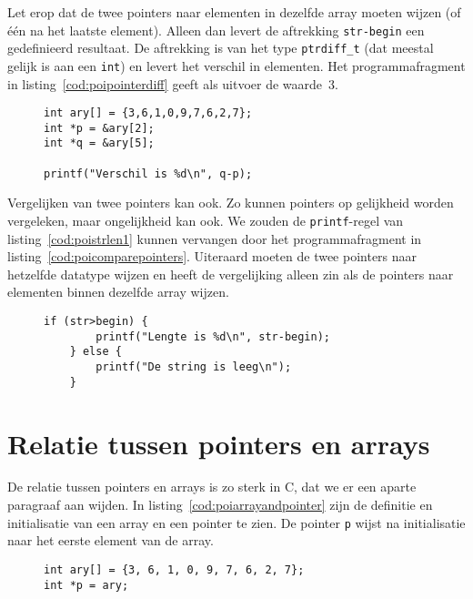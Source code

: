 Let erop dat de twee pointers naar elementen in dezelfde array moeten wijzen (of één na het laatste element). Alleen dan levert de aftrekking \texttt{str-begin} een gedefinieerd resultaat. De aftrekking is van het type \texttt{ptrdiff\_t} (dat meestal gelijk is aan een \texttt{int}) en levert het verschil in elementen. Het programmafragment in listing~\ref{cod:poipointerdiff} geeft als uitvoer de waarde~3.

\begin{figure}[!ht]
\begin{lstlisting}[caption=Het berekenen van het verschil van twee pointers.,label=cod:poipointerdiff]
int ary[] = {3,6,1,0,9,7,6,2,7};
int *p = &ary[2];
int *q = &ary[5];

printf("Verschil is %d\n", q-p);
\end{lstlisting}
\end{figure}

Vergelijken van twee pointers kan ook. Zo kunnen pointers op gelijkheid worden vergeleken, maar ongelijkheid kan ook. We zouden de \texttt{printf}-regel van listing~\ref{cod:poistrlen1} kunnen vervangen door het programmafragment in listing~\ref{cod:poicomparepointers}.
Uiteraard moeten de twee pointers naar hetzelfde datatype wijzen en heeft de vergelijking alleen zin als de pointers naar elementen binnen dezelfde array wijzen.

\begin{figure}[!ht]
\begin{lstlisting}[caption=Vergelijken van twee pointers.,label=cod:poicomparepointers]
    if (str>begin) {
        printf("Lengte is %d\n", str-begin);
    } else {
        printf("De string is leeg\n");
    }
\end{lstlisting}
\end{figure}


\section{Relatie tussen pointers en arrays}
\label{sec:relatietussenpointersenarrays}
De relatie tussen pointers en arrays is zo sterk in C, dat we er een aparte paragraaf aan wijden. In listing~\ref{cod:poiarrayandpointer} zijn de definitie en initialisatie van een array en een pointer te zien. De pointer \texttt{p} wijst na initialisatie naar het eerste element van de array.

\begin{figure}[!ht]
\begin{lstlisting}[caption=Definitie en initialisatie van een array en een pointer.,label=cod:poiarrayandpointer]
int ary[] = {3, 6, 1, 0, 9, 7, 6, 2, 7};
int *p = ary;
\end{lstlisting}
\end{figure}

